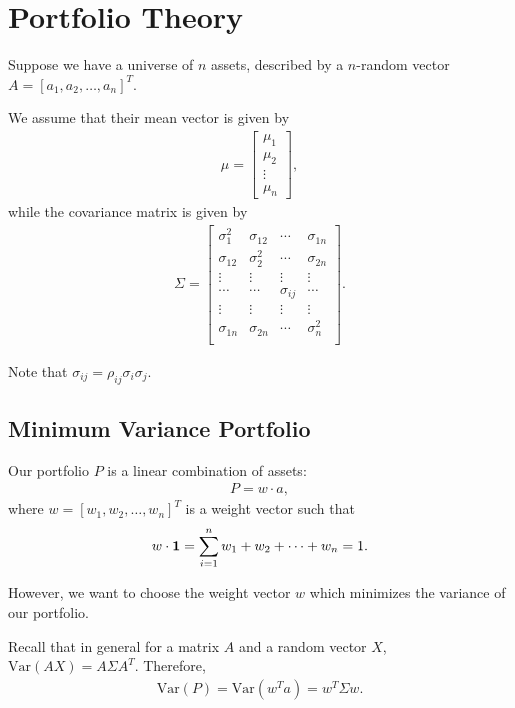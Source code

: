 \documentclass{amsart}
\theoremstyle{plain}
\numberwithin{equation}{section}
\begin{document}
\section{Portfolio Theory}
Suppose we have a universe of 
$n$ assets, described by a $n$-random vector 
$A =[a_1, a_2, \ldots, a_n]^T$.

We assume that their mean vector is given by 
\begin{align*}
\mu = 
\begin{bmatrix}
\mu_1\\
\mu_2\\
\vdots\\
\mu_n
\end{bmatrix},
\end{align*}
while the covariance matrix is given by
\begin{align*}
\Sigma = \begin{bmatrix}
\sigma_1^2  & \sigma_{12} & \cdots & \sigma_{1n}\\
\sigma_{12} & \sigma_2^2  & \cdots & \sigma_{2n}\\
\vdots      & \vdots      & \vdots & \vdots \\
\cdots      & \cdots      & \sigma_{ij} & \cdots \\
\vdots      & \vdots      & \vdots & \vdots \\
\sigma_{1n} & \sigma_{2n} & \cdots & \sigma_n^2\\
\end{bmatrix}.
\end{align*}

Note that $\sigma_{ij} = \rho_{ij} \sigma_i \sigma_j$.

\subsection*{Minimum Variance Portfolio}
Our portfolio $P$ is a linear combination of 
assets:
\begin{align*}
P = w \cdot a,
\end{align*}
where $w = [w_1, w_2, \ldots, w_n]^T$ is a weight 
vector such that \
\begin{align*}
w \cdot {\bf 1} = \sum_{i=1}^{n} w_1 + w_2 + \cdots + w_n = 1.
\end{align*}

However, we want to choose the weight vector 
$w$ which minimizes the variance of our 
portfolio.

Recall that in general for a matrix $A$ and a random vector $X$, 
$\mathrm{Var}(AX) = A\Sigma A^T$.
Therefore,
\begin{align*}
\mathrm{Var}(P) = \mathrm{Var}(w^T a) = w^T\Sigma w.
\end{align*}
\end{document}
